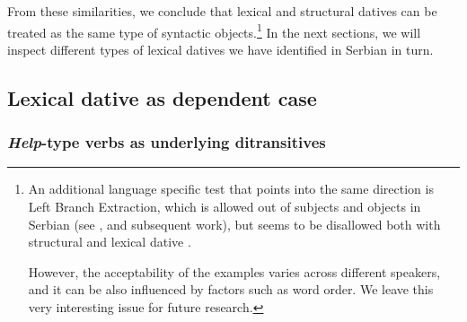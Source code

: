 \documentclass[output=paper,
modfonts,
newtxmath,
hidelinks
]{langscibook}
\begin{document}
\noindent From these similarities, we conclude that lexical and structural datives can be treated as the same type of syntactic objects.\footnote{An additional language specific test that points into the same direction is Left Branch Extraction, which is allowed out of subjects  and objects  in Serbian (see \citealt{bosk2005}, and subsequent work), but seems to be disallowed both with structural  and lexical dative .
	
	\ea
	\label{fn5exia}
	\label{fn5exib}
	\label{fn5exic}
	\label{fn5exid}
    \z \z 
	
\noindent However, the acceptability of the examples varies across different speakers, and it can be also influenced by factors such as word order. We leave this very interesting issue for future research.} In the next sections, we will inspect different types of lexical datives we have identified in Serbian in turn. 



\subsection{Lexical dative as dependent case}

\subsubsection{\textit{Help}-type verbs as underlying ditransitives}
\end{document}
